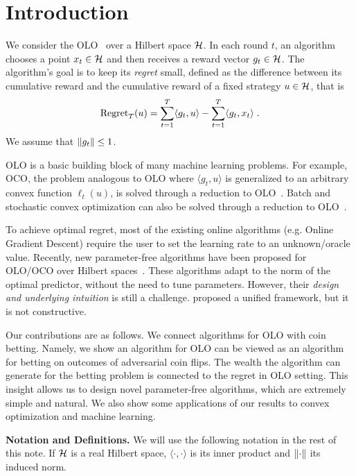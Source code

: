 \section{Introduction}
\label{section:introduction}

We consider the \ac{OLO}~\citep{Cesa-Bianchi-Lugosi-2006, Shalev-Shwartz-2011}
over a Hilbert space $\mathcal{H}$. In each round $t$, an algorithm chooses a point $x_t
\in \mathcal{H}$ and then receives a reward vector $g_t \in \mathcal{H}$. The algorithm's goal is
to keep its \emph{regret} small, defined as the difference between its
cumulative reward and the cumulative reward of a fixed strategy $u \in \mathcal{H}$,
that is
\[
\operatorname{Regret}_T(u) = \sum_{t=1}^T \langle g_t, u \rangle - \sum_{t=1}^T \langle g_t, x_t \rangle \; .
\]
We assume that $\left\|{g_t}\right\| \le 1$.

\ac{OLO} is a basic building block of many machine learning problems. For
example, \ac{OCO}, the problem analogous to \ac{OLO} where $\langle g_t, u
\rangle$ is generalized to an arbitrary convex function $\ell_t(u)$, is solved
through a reduction to \ac{OLO}~\citep{Shalev-Shwartz-2011}.  Batch and
stochastic convex optimization can also be solved through a reduction to
\ac{OLO}~\citep{Shalev-Shwartz-2011}.

To achieve optimal regret, most of the existing online algorithms (e.g.  Online
Gradient Descent) require the user to set the learning rate to an
unknown/oracle value. Recently, new parameter-free algorithms have been
proposed for \ac{OLO}/\ac{OCO} over Hilbert
spaces~\citep{Streeter-McMahan-2012, Orabona-2013, McMahan-Abernethy-2013,
McMahan-Orabona-2014, Orabona-2014}.  These algorithms adapt to the norm of the
optimal predictor, without the need to tune parameters. However, their
\emph{design and underlying intuition} is still a challenge.
\citet{Foster-Rakhlin-Sridharan-2015} proposed a unified framework, but it is
not constructive.

Our contributions are as follows. We connect algorithms for \ac{OLO} with coin
betting. Namely, we show an algorithm for \ac{OLO} can be viewed as an
algorithm for betting on outcomes of adversarial coin flips. The wealth the
algorithm can generate for the betting problem is connected to the regret in
\ac{OLO} setting. This insight allows us to design novel parameter-free
algorithms, which are extremely simple and natural. We also show some
applications of our results to convex optimization and machine learning.

\noindent\textbf{Notation and Definitions.}
We will use the following notation in the rest of this note.  If $\mathcal{H}$ is a real
Hilbert space, $\langle \cdot, \cdot \rangle$ is its inner product and
$\left\|{\cdot}\right\|$ its induced norm.
